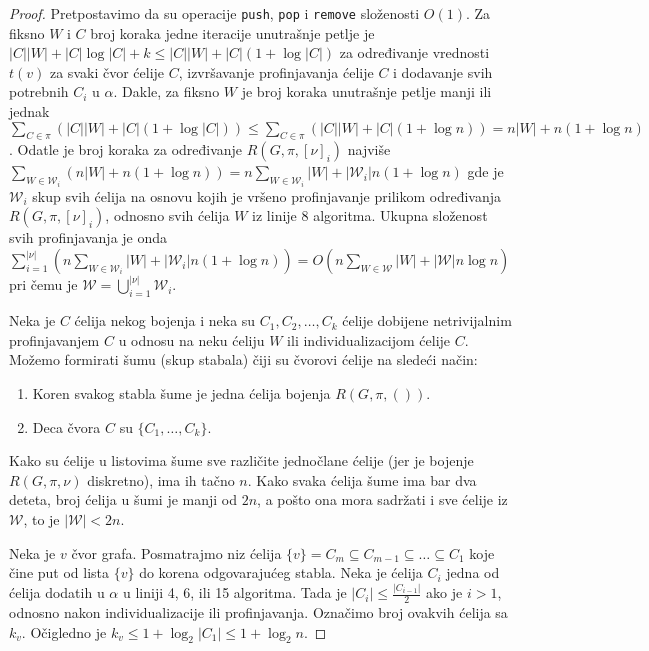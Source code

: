 \documentclass[12pt,oneside]{memoir}
\theoremstyle{definition}
\begin{document}
  \begin{proof}
	  Pretpostavimo da su operacije \texttt{push}, \texttt{pop} i
	  \texttt{remove} složenosti $O(1)$. Za fiksno $W$ i $C$ broj koraka jedne
	  iteracije unutrašnje petlje je $|C||W| + |C| \log |C| + k \leq |C||W| +
	  |C| (1 + \log |C|)$ za određivanje vrednosti $t(v)$ za svaki čvor ćelije
	  $C$, izvršavanje profinjavanja ćelije $C$ i dodavanje svih potrebnih
	  $C_i$ u $\alpha$. Dakle, za fiksno $W$ je broj koraka unutrašnje petlje
	  manji ili jednak $\sum_{C \in \pi}(|C||W| + |C| (1 + \log |C|)) \leq
	  \sum_{C \in \pi}(|C||W| + |C| (1 + \log n)) = n|W| + n(1 + \log n)$.
	  Odatle je broj koraka za određivanje $R(G, \pi, [\nu]_i)$ najviše
	  $\sum_{W \in \mathcal{W}_i} (n|W| + n(1 + \log n)) = n \sum_{W \in
	  \mathcal{W}_i} |W| + |\mathcal{W}_i| n (1 + \log n)$ gde je
	  $\mathcal{W}_i$ skup svih ćelija na osnovu kojih je vršeno profinjavanje
	  prilikom određivanja $R(G, \pi, [\nu]_i)$, odnosno svih ćelija $W$ iz
	  linije 8 algoritma. Ukupna složenost svih profinjavanja je onda
	  $\sum_{i=1}^{|\nu|}(n \sum_{W \in \mathcal{W}_i} |W| + |\mathcal{W}_i| n
	  (1 + \log n)) = O(n \sum_{W \in \mathcal{W}} |W| + |\mathcal{W}| n \log
	  n)$ pri čemu je $\mathcal{W} = \bigcup_{i = 1}^{|\nu|}\mathcal{W}_i$.

	  Neka je $C$ ćelija nekog bojenja i neka su $C_1, C_2, \dots, C_k$ ćelije
	  dobijene netrivijalnim profinjavanjem $C$ u odnosu na neku ćeliju $W$ ili
	  individualizacijom ćelije $C$. Možemo formirati šumu (skup stabala) čiji
	  su čvorovi ćelije na sledeći način:
	  \begin{enumerate}
		  \item Koren svakog stabla šume je jedna ćelija bojenja $R(G, \pi, ())$.
		  \item Deca čvora $C$ su $\{C_1, \dots, C_k\}$.
	  \end{enumerate}

	  Kako su ćelije u listovima šume sve različite jednočlane ćelije (jer je
	  bojenje $R(G, \pi, \nu)$ diskretno), ima ih tačno $n$. Kako svaka ćelija
	  šume ima bar dva deteta, broj ćelija u šumi je manji od $2n$, a pošto ona
	  mora sadržati i sve ćelije iz $\mathcal{W}$, to je $|\mathcal{W}| < 2n$.

	  Neka je $v$ čvor grafa. Posmatrajmo niz ćelija $\{v\} = C_m \subseteq
	  C_{m-1} \subseteq \dots \subseteq C_1$ koje čine put od lista $\{v\}$ do
	  korena odgovarajućeg stabla. Neka je ćelija $C_i$ jedna od ćelija dodatih
	  u $\alpha$ u liniji 4, 6, ili 15 algoritma. Tada je $|C_i| \leq
	  \frac{|C_{i-1}|}{2}$ ako je $i > 1$, odnosno nakon individualizacije ili
	  profinjavanja. Označimo broj ovakvih ćelija sa $k_v$. Očigledno je $k_v
	  \leq 1 + \log_2 |C_1| \leq 1 + \log_2 n$.


\end{proof}
\end{document}
